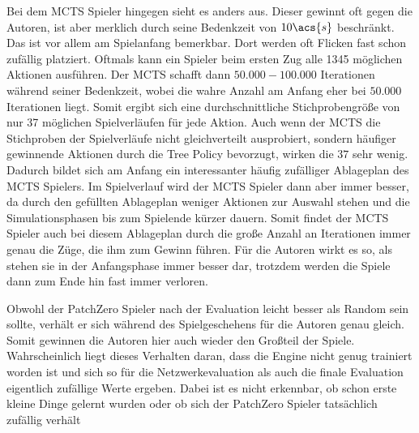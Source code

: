 Bei dem \ac{MCTS} Spieler hingegen sieht es anders aus. Dieser gewinnt oft gegen die Autoren, ist aber merklich durch seine Bedenkzeit von $10\acs{s}$ beschränkt. Das ist vor allem am Spielanfang bemerkbar. Dort werden oft Flicken fast schon zufällig platziert. Oftmals kann ein Spieler beim ersten Zug alle 1345 möglichen Aktionen ausführen. Der \ac{MCTS} schafft dann $50{.}000-100{.}000$ Iterationen während seiner Bedenkzeit, wobei die wahre Anzahl am Anfang eher bei $50{.}000$ Iterationen liegt. Somit ergibt sich eine durchschnittliche Stichprobengröße von nur 37 möglichen Spielverläufen für jede Aktion. Auch wenn der \ac{MCTS} die Stichproben der Spielverläufe nicht gleichverteilt ausprobiert, sondern häufiger gewinnende Aktionen durch die Tree Policy bevorzugt, wirken die $37$ sehr wenig. Dadurch bildet sich am Anfang ein interessanter häufig zufälliger Ablageplan des \ac{MCTS} Spielers. Im Spielverlauf wird der \ac{MCTS} Spieler dann aber immer besser, da durch den gefüllten Ablageplan weniger Aktionen zur Auswahl stehen und die Simulationsphasen bis zum Spielende kürzer dauern. Somit findet der \ac{MCTS} Spieler auch bei diesem Ablageplan durch die große Anzahl an Iterationen immer genau die Züge, die ihm zum Gewinn führen. Für die Autoren wirkt es so, als stehen sie in der Anfangsphase immer besser dar, trotzdem werden die Spiele dann zum Ende hin fast immer verloren.

Obwohl der PatchZero Spieler nach der Evaluation leicht besser als Random sein sollte, verhält er sich während des Spielgeschehens für die Autoren genau gleich. Somit gewinnen die Autoren hier auch wieder den Großteil der Spiele. Wahrscheinlich liegt dieses Verhalten daran, dass die Engine nicht genug trainiert worden ist und sich so für die Netzwerkevaluation als auch die finale Evaluation eigentlich zufällige Werte ergeben. Dabei ist es nicht erkennbar, ob schon erste kleine Dinge gelernt wurden oder ob sich der PatchZero Spieler tatsächlich zufällig verhält